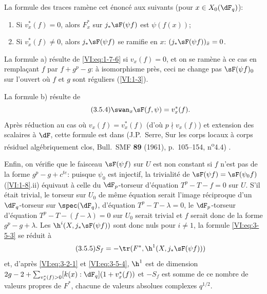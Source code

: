 La formule des traces ramène cet énoncé aux suivants (pour 
$x\in X_0(\dF_q)$): 
\begin{enumerate}[\indent a)]
  \item Si $v_x^\ast(f)=0$, alors $F_x^\ast$ sur $j_\ast \sF(\psi f)$ est 
    $\psi(f(x))$; 
  \item Si $v_x^\ast(f)\ne 0$, alors $j_\ast \sF(\psi f)$ se ramifie en $x$: 
    $(j_\ast \sF(\psi f))_{\bar x}=0$. 
\end{enumerate}

La formule a) résulte de \eqref{VI:eq:1-7-6} si $v_x(f)=0$, et on se ramène 
à ce cas en remplaçant $f$ par $f+g^p-g$: à isomorphisme près, ceci ne 
change pas $\sF(\psi f)_0$ sur l'ouvert où $f$ et $g$ sont réguliers 
(\ref{VI:1-3}). 

La formule b) résulte de 
\begin{equation*}\tag{3.5.4}\label{VI:eq:3-5-4}
  \swan_x \sF(f,\psi) = v_x^\ast(f) \text{.} 
\end{equation*}
Après réduction au cas où $v_x(f)=v_x^\ast(f)$ (d'où $p\nmid v_x(f)$) 
et extension des scalaires à $\dF$, cette formule est dans 
(J.P.~Serre, Sur les corps locaux à corps résiduel algébriquement clos, Bull.~SMF \textbf{89} (1961), p.~105--154, n\textsuperscript{o}4.4) \cite[4.4]{se61}. 

Enfin, on vérifie que le faisceau $\sF(\psi f)$ sur $U$ est non constant si 
$f$ n'est pas de la forme $g^p-g+c^{t e}$: puisque $\psi_0$ est injectif, la 
trivialité de $\sF(\psi f)=\sF(\psi_0 f)$ (\ref{VI:1-8}.ii) équivaut à 
celle du $\dF_p$-torseur d'équation $T^p-T-f=0$ sur $U$. S'il était trivial, 
le torseur sur $U_0$ de même équation 
serait l'image réciproque d'un 
$\dF_q$-torseur sur $\spec(\dF_q)$, d'équation $T^p-T-\lambda=0$, le 
$\dF_p$-torseur d'équation $T^p-T-(f-\lambda)=0$ sur $U_0$ serait trivial 
et $f$ serait donc de la forme $g^p-g+\lambda$. Les 
$\h^i(X,j_\ast \sF(\psi f))$ sont donc nuls pour $i\ne 1$, la formule 
\eqref{VI:eq:3-5-3} se réduit à 
\begin{equation*}\tag{3.5.5}\label{VI:eq:3-5-5}
  S_f = -\tr(F^\ast,\h^1(X,j_\ast \sF(\psi f))) 
\end{equation*}
et, d'après \eqref{VI:eq:3-2-1} et \eqref{VI:eq:3-5-4}, $\h^1$ est de 
dimension $2 g-2+\sum_{v_x^\ast(f)>0} [k(x):\dF_q](1+v_x^\ast(f))$ et $-S_f$ 
est somme de ce nombre de valeurs propres de $F^\ast$, chacune de valeurs 
absolues complexes $q^{1/2}$. 





